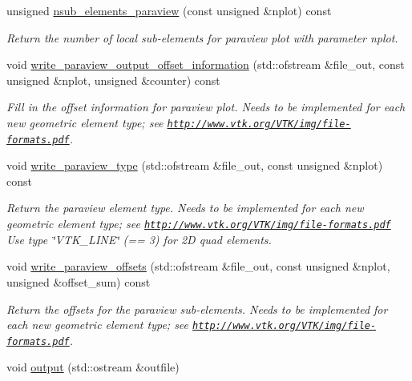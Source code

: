\begin{DoxyCompactItemize}
unsigned \hyperlink{classoomph_1_1QElement_3_011_00_01NNODE__1D_01_4_acae0f2a725ee8e87632e8f4e0fd9ae40}{nsub\+\_\+elements\+\_\+paraview} (const unsigned \&nplot) const
\begin{DoxyCompactList}\small\item\em Return the number of local sub-\/elements for paraview plot with parameter nplot. \end{DoxyCompactList}\item 
void \hyperlink{classoomph_1_1QElement_3_011_00_01NNODE__1D_01_4_a2ecd9caf79d1b2879dc0bdc92d8be525}{write\+\_\+paraview\+\_\+output\+\_\+offset\+\_\+information} (std\+::ofstream \&file\+\_\+out, const unsigned \&nplot, unsigned \&counter) const
\begin{DoxyCompactList}\small\item\em Fill in the offset information for paraview plot. Needs to be implemented for each new geometric element type; see \href{http://www.vtk.org/VTK/img/file-formats.pdf}{\tt http\+://www.\+vtk.\+org/\+V\+T\+K/img/file-\/formats.\+pdf}. \end{DoxyCompactList}\item 
void \hyperlink{classoomph_1_1QElement_3_011_00_01NNODE__1D_01_4_ad67ce1247dd524db694c6e2d33ec1ffb}{write\+\_\+paraview\+\_\+type} (std\+::ofstream \&file\+\_\+out, const unsigned \&nplot) const
\begin{DoxyCompactList}\small\item\em Return the paraview element type. Needs to be implemented for each new geometric element type; see \href{http://www.vtk.org/VTK/img/file-formats.pdf}{\tt http\+://www.\+vtk.\+org/\+V\+T\+K/img/file-\/formats.\+pdf} Use type \char`\"{}\+V\+T\+K\+\_\+\+L\+I\+N\+E\char`\"{} (== 3) for 2D quad elements. \end{DoxyCompactList}\item 
void \hyperlink{classoomph_1_1QElement_3_011_00_01NNODE__1D_01_4_afa1eb7a140c4150932cc39e5c7ddf4c7}{write\+\_\+paraview\+\_\+offsets} (std\+::ofstream \&file\+\_\+out, const unsigned \&nplot, unsigned \&offset\+\_\+sum) const
\begin{DoxyCompactList}\small\item\em Return the offsets for the paraview sub-\/elements. Needs to be implemented for each new geometric element type; see \href{http://www.vtk.org/VTK/img/file-formats.pdf}{\tt http\+://www.\+vtk.\+org/\+V\+T\+K/img/file-\/formats.\+pdf}. \end{DoxyCompactList}\item 
void \hyperlink{classoomph_1_1QElement_3_011_00_01NNODE__1D_01_4_ac157449520794a71b85b66428c4e38ba}{output} (std\+::ostream \&outfile)

\end{DoxyCompactItemize}
